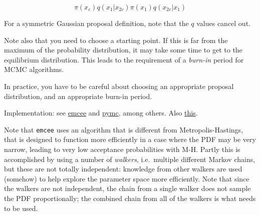 \documentclass[12pt]{article}
\begin{document}
$$ \pi(x_c)q(x_1|x_{2c}) \pi(x_1)q(x_{2c}|x_1)  $$

For a symmetric Gaussian proposal definition, note that the $q$ values
cancel out.

Note also that you need to choose a starting point. If this is far from
the maximum of the probability distribution, it may take some time to
get to the equilibrium distribution. This leads to the requirement of a
\emph{burn-in} period for MCMC algorithms.

In practice, you have to be careful about choosing an appropriate
proposal distribution, and an appropriate burn-in period.

Implementation: see \href{http://dan.iel.fm/emcee/current/}
{emcee} and \href{https://pymc-devs.github.io/pymc/}
{pymc}, among others. Also
\href{http://jakevdp.github.io/blog/2014/06/14/frequentism-and-bayesianism-4-bayesian-in-python/}
{this}.

Note that \texttt{emcee} uses an algorithm that is different from
Metropolis-Hastings, that is designed to function more efficiently
in a case where the PDF may be very narrow, leading to very low
acceptance probabilities with M-H. Partly this is accomplished by
using a number of \emph{walkers}, i.e.\ multiple different Markov
chains, but these are not totally independent: knowledge from other
walkers are used (somehow) to help explore the parameter space more
efficiently. Note that since the walkers are not independent, the
chain from a single walker does not sample the PDF proportionally;
the combined chain from all of the walkers is what needs to be used.
\end{document}
